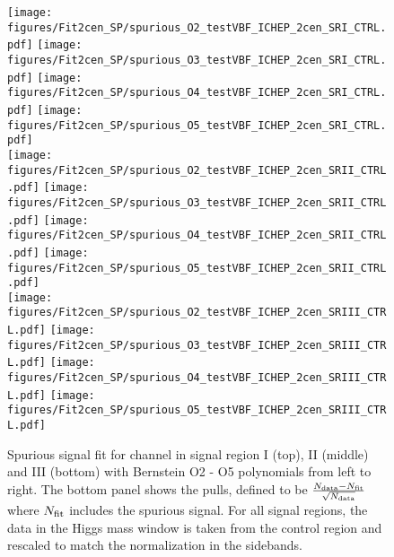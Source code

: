 \begin{figure}[htbp]
  \centering
 \texttt{[image: figures/Fit2cen\_SP/spurious\_O2\_testVBF\_ICHEP\_2cen\_SRI\_CTRL.pdf]}
 \texttt{[image: figures/Fit2cen\_SP/spurious\_O3\_testVBF\_ICHEP\_2cen\_SRI\_CTRL.pdf]}
 \texttt{[image: figures/Fit2cen\_SP/spurious\_O4\_testVBF\_ICHEP\_2cen\_SRI\_CTRL.pdf]}
 \texttt{[image: figures/Fit2cen\_SP/spurious\_O5\_testVBF\_ICHEP\_2cen\_SRI\_CTRL.pdf]}\\
 \texttt{[image: figures/Fit2cen\_SP/spurious\_O2\_testVBF\_ICHEP\_2cen\_SRII\_CTRL.pdf]}
 \texttt{[image: figures/Fit2cen\_SP/spurious\_O3\_testVBF\_ICHEP\_2cen\_SRII\_CTRL.pdf]}
 \texttt{[image: figures/Fit2cen\_SP/spurious\_O4\_testVBF\_ICHEP\_2cen\_SRII\_CTRL.pdf]}
 \texttt{[image: figures/Fit2cen\_SP/spurious\_O5\_testVBF\_ICHEP\_2cen\_SRII\_CTRL.pdf]}\\
 \texttt{[image: figures/Fit2cen\_SP/spurious\_O2\_testVBF\_ICHEP\_2cen\_SRIII\_CTRL.pdf]}
 \texttt{[image: figures/Fit2cen\_SP/spurious\_O3\_testVBF\_ICHEP\_2cen\_SRIII\_CTRL.pdf]}
 \texttt{[image: figures/Fit2cen\_SP/spurious\_O4\_testVBF\_ICHEP\_2cen\_SRIII\_CTRL.pdf]}
 \texttt{[image: figures/Fit2cen\_SP/spurious\_O5\_testVBF\_ICHEP\_2cen\_SRIII\_CTRL.pdf]}\\
\caption{Spurious signal fit for \twocentral channel in signal region I (top), II (middle) and III (bottom) with Bernstein O2 - O5 polynomials from left to right.  The bottom panel shows the pulls, defined to be $\frac{N_{\rm data} - N_{\rm fit}}{\sqrt{N_{\rm data}}}$ where $N_{\rm fit}$ includes the spurious signal. For all signal regions, the data in the Higgs mass window is taken from the control region and rescaled to match the normalization in the sidebands.}
  \label{fig:Fit_SP_2cen-old}
\end{figure}

